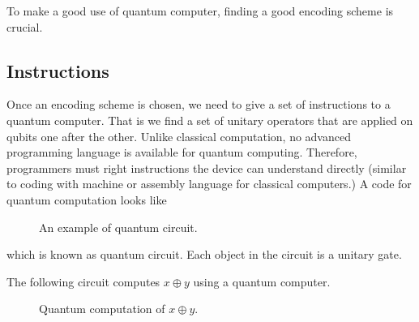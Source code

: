 \documentclass[letterpaper,10pt,english]{jupyterBook}
\begin{document}
\sphinxAtStartPar
To make a good use of quantum computer, finding a good encoding scheme is crucial.


\subsection{Instructions}
\label{\detokenize{computation/qcomp:instructions}}
\sphinxAtStartPar
Once an encoding scheme is chosen, we need to give a set of instructions to a quantum computer.  That is we find a set of unitary operators that are applied on qubits one after the other. Unlike classical computation, no advanced programming language is available for quantum computing.  Therefore, programmers must right  instructions the device can understand directly (similar to coding with machine or assembly language for classical computers.)  A code for quantum computation looks like

\begin{figure}[htbp]
\centering
\capstart

\noindent{}
\caption{An example of quantum circuit.}\label{\detokenize{computation/qcomp:qc-example}}\end{figure}

\sphinxAtStartPar
which is known as quantum circuit.  Each object in the circuit is a unitary gate.

\sphinxAtStartPar
The following circuit computes \(x \oplus y\) using a quantum computer.

\begin{figure}[htbp]
\centering
\capstart

\noindent{}
\caption{Quantum computation of \(x \oplus y\).}\label{\detokenize{computation/qcomp:quantum-x-y}}\end{figure}
\end{document}
